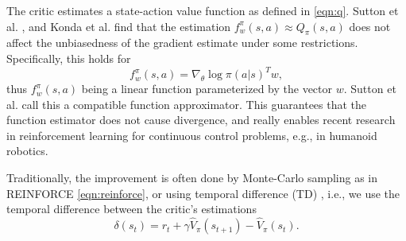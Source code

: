 \documentclass[final]{IEEEtran}
\begin{document}
The critic estimates a state-action value function as defined in \eqref{eqn:q}. 
Sutton et al. \cite{Sutton:1999:PGM:3009657.3009806}, and Konda et al. \cite{Konda:2003:AA:942271.942292} find that the estimation $f_w^\pi(s,a) \approx Q_\pi(s,a)$ does not affect the unbiasedness of the gradient estimate under some restrictions. 
Specifically, this holds for 
\begin{equation}
	f_w^\pi(s,a) = {\nabla_\theta \log\pi(a|s)}^T w,
	\label{eqn:compatible-approximator}
\end{equation}
thus $f_w^\pi(s,a)$ being a linear function parameterized by the vector $w$.
Sutton et al. \cite{Sutton:1999:PGM:3009657.3009806} call this a compatible function approximator.
This guarantees that the function estimator does not cause divergence, and really enables recent research in reinforcement learning for continuous control problems, e.g., in humanoid robotics.

Traditionally, the improvement is often done by Monte-Carlo sampling as in REINFORCE \eqref{eqn:reinforce}, or using temporal difference (TD) \cite{Sutton1988}, i.e., we use the temporal difference between the critic's estimations 
\begin{equation}
  \delta(s_t) = r_t + \gamma \hat{V}_\pi(s_{t+1}) - \hat{V}_\pi(s_t).
  \label{eqn:td-error}
\end{equation}
\end{document}
